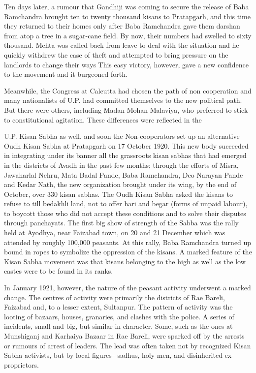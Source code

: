 Ten days later, a rumour that Gandhiji was coming to secure the release of Baba Ramchandra brought ten to twenty thousand kisans to Pratapgarh, and this time they returned to their homes only after Baba Ramchandra gave them darshan from atop a tree in a sugar-cane field. By now, their numbers had swelled to sixty thousand. Mehta was called back from leave to deal with the situation and he quickly withdrew the case of theft and attempted to bring pressure on the landlords to change their ways This easy victory, however, gave a new confidence to the movement and it burgeoned forth.

Meanwhile, the Congress at Calcutta had chosen the path of non cooperation and many nationalists of U.P. had committed themselves to the new political path. But there were others, including Madan Mohan Malaviya, who preferred to stick to constitutional agitation. These differences were reflected in the

U.P. Kisan Sabha as well, and soon the Non-cooperators set up an alternative Oudh Kisan Sabha at Pratapgarh on 17 October 1920. This new body succeeded in integrating under its banner all the grassroots kisan sabhas that had emerged in the districts of Avadh in the past few months; through the efforts of Misra, Jawaharlal Nehru, Mata Badal Pande, Baba Ramchandra, Deo Narayan Pande and Kedar Nath, the new organization brought under its wing, by the end of October, over 330 kisan sabhas. The Oudh Kisan Sabha asked the kisans to refuse to till bedakhli land, not to offer hari and begar (forms of unpaid labour), to boycott those who did not accept these conditions and to solve their disputes through panchayats. The first big show of strength of the Sabba was the rally held at Ayodhya, near Faizabad town, on 20 and 21 December which was attended by roughly 100,000 peasants. At this rally, Baba Ramchandra turned up bound in ropes to symbolize the oppression of the kisans. A marked feature of the Kisan Sabha movement was that kisans belonging to the high as well as the low castes were to be found in its ranks.

In January 1921, however, the nature of the peasant activity underwent a marked change. The centres of activity were primarily the districts of Rae Bareli, Faizabad and, to a lesser extent, Sultanpur. The pattern of activity was the looting of bazaars, houses, granaries, and clashes with the police. A series of incidents, small and big, but similar in character. Some, such as the ones at Munshiganj and Karhaiya Bazaar in Rae Bareli, were sparked off by the arrests or rumours of arrest of leaders. The lead was often taken not by recognized Kisan Sabha activists, but by local figures-- sadhus, holy men, and disinherited ex- proprietors.

